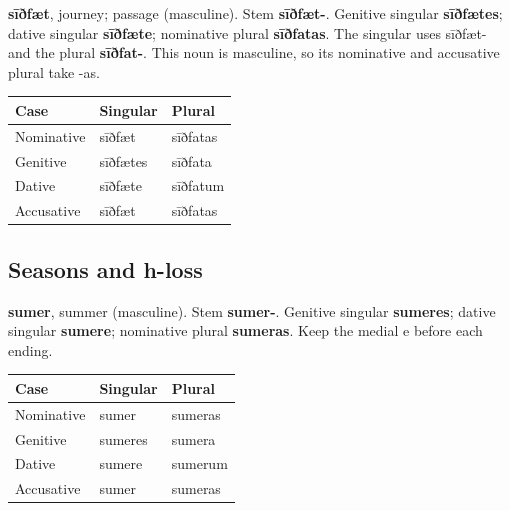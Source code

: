 \textbf{sīðfæt}, journey; passage (masculine). Stem \textbf{sīðfæt-}. Genitive singular \textbf{sīðfætes}; dative singular \textbf{sīðfæte}; nominative plural \textbf{sīðfatas}. The singular uses sīðfæt- and the plural \textbf{sīðfat-}. This noun is masculine, so its nominative and accusative plural take -as.

\par\begingroup
\fontsize{10.5}{13.2}\selectfont
\setlength{\LTleft}{0pt}\setlength{\LTright}{\fill}
\noindent
\begin{tabular}{@{}>{\raggedright\arraybackslash}p{39.46mm}>{\raggedright\arraybackslash}p{39.46mm}>{\raggedright\arraybackslash}p{39.46mm}@{}}
\toprule
\textbf{Case} & \textbf{Singular} & \textbf{Plural} \\
\midrule
Nominative & sīðfæt & sīðfatas \\
Genitive & sīðfætes & sīðfata \\
Dative & sīðfæte & sīðfatum \\
Accusative & sīðfæt & sīðfatas \\
\bottomrule
\end{tabular}
\par\endgroup

\subsection*{Seasons and h-loss}

\textbf{sumer}, summer (masculine). Stem \textbf{sumer-}. Genitive singular \textbf{sumeres}; dative singular \textbf{sumere}; nominative plural \textbf{sumeras}. Keep the medial e before each ending.

\par\begingroup
\fontsize{10.5}{13.2}\selectfont
\setlength{\LTleft}{0pt}\setlength{\LTright}{\fill}
\noindent
\begin{tabular}{@{}>{\raggedright\arraybackslash}p{39.46mm}>{\raggedright\arraybackslash}p{39.46mm}>{\raggedright\arraybackslash}p{39.46mm}@{}}
\toprule
\textbf{Case} & \textbf{Singular} & \textbf{Plural} \\
\midrule
Nominative & sumer & sumeras \\
Genitive & sumeres & sumera \\
Dative & sumere & sumerum \\
Accusative & sumer & sumeras \\
\bottomrule
\end{tabular}
\par\endgroup

